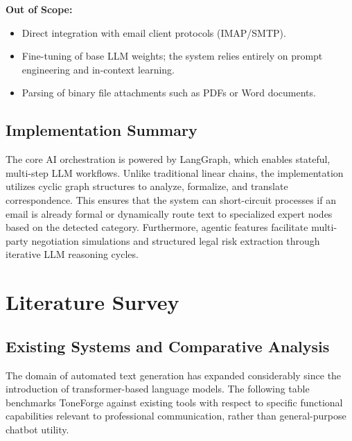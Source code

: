 \documentclass[12pt,a4paper]{report}
\begin{document}
\noindent\textbf{Out of Scope:}
\begin{itemize}
	\item Direct integration with email client protocols (IMAP/SMTP).
	\item Fine-tuning of base LLM weights; the system relies entirely on prompt engineering and in-context learning.
	\item Parsing of binary file attachments such as PDFs or Word documents.
\end{itemize}

\section{Implementation Summary}
The core AI orchestration is powered by LangGraph, which enables stateful, multi-step LLM workflows. Unlike traditional linear chains, the implementation utilizes cyclic graph structures to analyze, formalize, and translate correspondence. This ensures that the system can short-circuit processes if an email is already formal or dynamically route text to specialized expert nodes based on the detected category. Furthermore, agentic features facilitate multi-party negotiation simulations and structured legal risk extraction through iterative LLM reasoning cycles.

\chapter{Literature Survey}

\section{Existing Systems and Comparative Analysis}
The domain of automated text generation has expanded considerably since the introduction of transformer-based language models. The following table benchmarks ToneForge against existing tools with respect to specific functional capabilities relevant to professional communication, rather than general-purpose chatbot utility.
\end{document}
